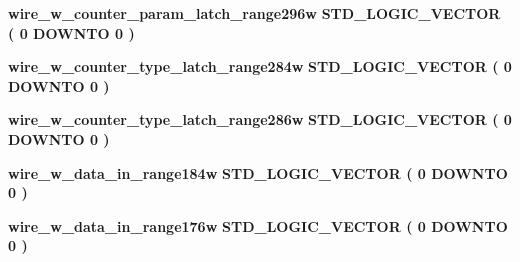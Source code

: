 \begin{DoxyCompactItemize}
\item 
{\bf wire\+\_\+w\+\_\+counter\+\_\+param\+\_\+latch\+\_\+range296w} {\bfseries \textcolor{comment}{S\+T\+D\+\_\+\+L\+O\+G\+I\+C\+\_\+\+V\+E\+C\+T\+OR}\textcolor{vhdlchar}{ }\textcolor{vhdlchar}{(}\textcolor{vhdlchar}{ }\textcolor{vhdlchar}{ } \textcolor{vhdldigit}{0} \textcolor{vhdlchar}{ }\textcolor{keywordflow}{D\+O\+W\+N\+TO}\textcolor{vhdlchar}{ }\textcolor{vhdlchar}{ } \textcolor{vhdldigit}{0} \textcolor{vhdlchar}{ }\textcolor{vhdlchar}{)}\textcolor{vhdlchar}{ }} 
\item 
{\bf wire\+\_\+w\+\_\+counter\+\_\+type\+\_\+latch\+\_\+range284w} {\bfseries \textcolor{comment}{S\+T\+D\+\_\+\+L\+O\+G\+I\+C\+\_\+\+V\+E\+C\+T\+OR}\textcolor{vhdlchar}{ }\textcolor{vhdlchar}{(}\textcolor{vhdlchar}{ }\textcolor{vhdlchar}{ } \textcolor{vhdldigit}{0} \textcolor{vhdlchar}{ }\textcolor{keywordflow}{D\+O\+W\+N\+TO}\textcolor{vhdlchar}{ }\textcolor{vhdlchar}{ } \textcolor{vhdldigit}{0} \textcolor{vhdlchar}{ }\textcolor{vhdlchar}{)}\textcolor{vhdlchar}{ }} 
\item 
{\bf wire\+\_\+w\+\_\+counter\+\_\+type\+\_\+latch\+\_\+range286w} {\bfseries \textcolor{comment}{S\+T\+D\+\_\+\+L\+O\+G\+I\+C\+\_\+\+V\+E\+C\+T\+OR}\textcolor{vhdlchar}{ }\textcolor{vhdlchar}{(}\textcolor{vhdlchar}{ }\textcolor{vhdlchar}{ } \textcolor{vhdldigit}{0} \textcolor{vhdlchar}{ }\textcolor{keywordflow}{D\+O\+W\+N\+TO}\textcolor{vhdlchar}{ }\textcolor{vhdlchar}{ } \textcolor{vhdldigit}{0} \textcolor{vhdlchar}{ }\textcolor{vhdlchar}{)}\textcolor{vhdlchar}{ }} 
\item 
{\bf wire\+\_\+w\+\_\+data\+\_\+in\+\_\+range184w} {\bfseries \textcolor{comment}{S\+T\+D\+\_\+\+L\+O\+G\+I\+C\+\_\+\+V\+E\+C\+T\+OR}\textcolor{vhdlchar}{ }\textcolor{vhdlchar}{(}\textcolor{vhdlchar}{ }\textcolor{vhdlchar}{ } \textcolor{vhdldigit}{0} \textcolor{vhdlchar}{ }\textcolor{keywordflow}{D\+O\+W\+N\+TO}\textcolor{vhdlchar}{ }\textcolor{vhdlchar}{ } \textcolor{vhdldigit}{0} \textcolor{vhdlchar}{ }\textcolor{vhdlchar}{)}\textcolor{vhdlchar}{ }} 
\item 
{\bf wire\+\_\+w\+\_\+data\+\_\+in\+\_\+range176w} {\bfseries \textcolor{comment}{S\+T\+D\+\_\+\+L\+O\+G\+I\+C\+\_\+\+V\+E\+C\+T\+OR}\textcolor{vhdlchar}{ }\textcolor{vhdlchar}{(}\textcolor{vhdlchar}{ }\textcolor{vhdlchar}{ } \textcolor{vhdldigit}{0} \textcolor{vhdlchar}{ }\textcolor{keywordflow}{D\+O\+W\+N\+TO}\textcolor{vhdlchar}{ }\textcolor{vhdlchar}{ } \textcolor{vhdldigit}{0} \textcolor{vhdlchar}{ }\textcolor{vhdlchar}{)}\textcolor{vhdlchar}{ }} 
\item 

\end{DoxyCompactItemize}
